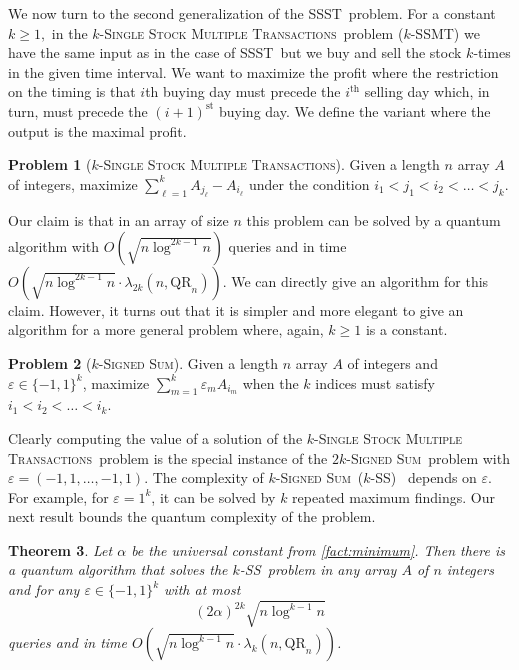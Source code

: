 \documentclass[12pt]{article}
\newcommand{\qr}{\mathrm{QR}}
\newcommand{\SSST}{\textsc{SSST}}
\newcommand{\SSMTf}{\textsc{Single Stock Multiple Transactions}}
\newcommand{\SSMT}{\textsc{SSMT}}
\newcommand{\SiSf}{\textsc{Signed Sum}}
\newcommand{\SiS}{\textsc{SS}}
\newtheorem{theorem}{Theorem}
\theoremstyle{definition}
\newtheorem{problem}[theorem]{Problem}
\begin{document}
We now turn to the second generalization of the \SSST \ problem.
For a constant $k \geq 1,$ in the $k$-\SSMTf \ problem ($k$-\SSMT) we have the same input as in the case of  \SSST \ but we buy and sell the stock $k$-times in the given time interval. 
We want to maximize the profit where the restriction on the timing is that $i$th  buying day must precede the $i^\text{th}$ selling day which, in turn, must precede the $(i+1)^\text{st}$ buying day.
We define the variant where the output is the maximal profit.

\begin{problem}[$k$-\SSMTf] 
Given a length $n$ array $A$ of integers, maximize $\sum_{\ell =1}^k A_{j_{\ell}} - A_{i_{\ell}}$ under the condition $i_1 < j_1 < i_2< \ldots < j_k$.
\end{problem}

Our claim is that in an array of size $n$ this problem can be solved by a quantum algorithm with $O(\sqrt{n \log^{2k-1} n})$
queries and in time $O(\sqrt{n \log^{2k - 1} n} \cdot \lambda_{2k} (n, \qr_n))$. 
We can directly give an algorithm for this claim. However, it turns out that it is simpler and more elegant to give an algorithm for a more general problem where, again, $k \geq 1$ is a constant.

\begin{problem}[$k$-\SiSf] 
Given a length $n$ array $A$ of integers and $\varepsilon \in \{-1,1\}^k$, maximize $\sum_{m =1}^k  \varepsilon_m A_{i_m}$ when the $k$ indices must satisfy
$i_1  < i_2< \ldots < i_k$. 
\end{problem}

Clearly computing the value of a solution of the $k$-\SSMTf \ problem is the special instance of the $2k$-\SiSf \ problem with $\varepsilon = (-1,1, \ldots, -1,1)$.
The complexity of $k$-\SiSf\ ($k$-\SiS) \ depends on $\varepsilon$. For example, for $\varepsilon = 1^k$, it can be solved by
$k$ repeated maximum findings. Our next result bounds the quantum complexity of the problem.

\begin{theorem}
\label{thm:k-sis}
Let $\alpha$ be the universal constant from \cref{fact:minimum}. 
Then there is a quantum algorithm that solves the $k$-\SiS \ problem in any array $A$ of $n$ integers and for any $\varepsilon \in \{-1,1\}^k$ with at most $$(2\alpha)^{2k} \sqrt{n \log^{k-1} n}$$ queries and in time $O(\sqrt{n \log^{k-1} n} \cdot \lambda_k(n,\qr_n))$.
\end{theorem}
\end{document}
